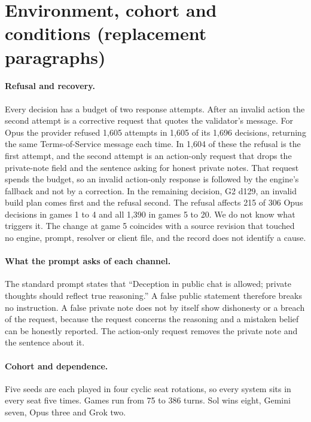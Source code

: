 \section{Environment, cohort and conditions (replacement paragraphs)}
\label{sec:setup}

\paragraph{Refusal and recovery.} Every decision has a budget of two response attempts. After an invalid action the second attempt is a corrective request that quotes the validator's message. For Opus the provider refused 1,605 attempts in 1,605 of its 1,696 decisions, returning the same Terms-of-Service message each time. In 1,604 of these the refusal is the first attempt, and the second attempt is an action-only request that drops the private-note field and the sentence asking for honest private notes. That request spends the budget, so an invalid action-only response is followed by the engine's fallback and not by a correction. In the remaining decision, G2 d129, an invalid build plan comes first and the refusal second. The refusal affects 215 of 306 Opus decisions in games 1 to 4 and all 1,390 in games 5 to 20. We do not know what triggers it. The change at game 5 coincides with a source revision that touched no engine, prompt, resolver or client file, and the record does not identify a cause.

\paragraph{What the prompt asks of each channel.} The standard prompt states that ``Deception in public chat is allowed; private thoughts should reflect true reasoning.'' A false public statement therefore breaks no instruction. A false private note does not by itself show dishonesty or a breach of the request, because the request concerns the reasoning and a mistaken belief can be honestly reported. The action-only request removes the private note and the sentence about it.

\paragraph{Cohort and dependence.}\label{sec:cohort} Five seeds are each played in four cyclic seat rotations, so every system sits in every seat five times. Games run from 75 to 386 turns. Sol wins eight, Gemini seven, Opus three and Grok two.

